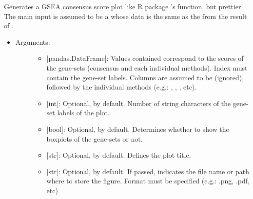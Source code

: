 \documentclass[letterpaper,10pt,english]{sphinxmanual}
\begin{document}

\begin{fulllineitems}
\label{\detokenize{plots:data_tools.plots.piano_consensus}}
Generates a GSEA consensus score plot like R package ’s
 function, but prettier.
The main input is assumed to be a  whose data
is the same as the  from the result of
.
\begin{itemize}
\item {} \begin{description}
\item[{Arguments:}] \leavevmode\begin{itemize}
\item {} 
 {[}pandas.DataFrame{]}: Values contained correspond to the
scores of the gene-sets (consensus and each individual
methods). Index must contain the gene-set labels. Columns are
assumed to be  (ignored),  followed
by the individual methods (e.g.: , ,
, etc).

\item {} 
 {[}int{]}: Optional,  by default. Number of string
characters of the gene-set labels of the plot.

\item {} 
 {[}bool{]}: Optional,  by default. Determines
whether to show the boxplots of the gene-sets or not.

\item {} 
 {[}str{]}: Optional,  by default. Defines the plot
title.

\item {} 
 {[}str{]}: Optional,  by default. If passed,
indicates the file name or path where to store the figure.
Format must be specified (e.g.: .png, .pdf, etc)


\end{itemize}
\end{description}
\end{itemize}
\end{fulllineitems}
\end{document}
